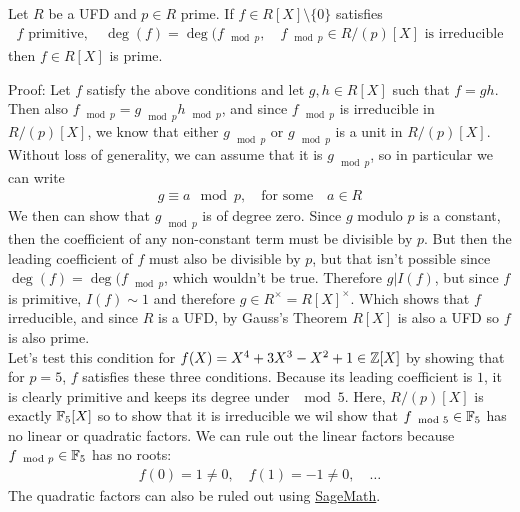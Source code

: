 \begin{proposition}[]
	Let $R$ be a UFD and $p \in R$ prime. If $f \in R[X] \setminus \{0\}$ satisfies
	\begin{align*}
		f \text{ primitive}, \quad \deg(f) = \deg(f_{\mod p}, \quad f_{\mod p} \in R/(p)[X] \text{ is irreducible}
	\end{align*}
	then $f \in R[X]$ is prime.
\end{proposition}
Proof: Let $f$ satisfy the above conditions and let $g, h \in R[X]$ such that $f = gh$. Then also $f_{\mod p} = g_{\mod p} h_{\mod p}$, and since $f_{\mod p}$ is irreducible in $R/(p)[X]$, we know that either $g_{\mod p}$ or $g_{\mod p}$ is a unit in $R/(p)[X]$. 
Without loss of generality, we can assume that it is $g_{\mod p}$, so in particular we can write 
\begin{align*}
	g \equiv a \mod p, \quad \text{for some} \quad a \in R
\end{align*}
We then can show that $g_{\mod p}$ is of degree zero. Since $g$ modulo $p$ is a constant, then the coefficient of any non-constant term must be divisible by $p$. But then the leading coefficient of $f$ must also be divisible by $p$, but that isn't possible since $\deg(f) = \deg(f_{\mod p}$, which wouldn't be true.
Therefore $g | I(f)$, but since $f$ is primitive, $I(f) \sim 1$ and therefore $g \in R^{\times} = R[X]^{\times}$. Which shows that $f$ irreducible, and since $R$ is a UFD, by Gauss's Theorem $R[X]$ is also a UFD so $f$ is also prime.\\


Let's test this condition for $f(X) = X^4 + 3X^3 - X^2 + 1 \in \mathbb{Z}[X]$ by showing that for $p = 5$, $f$ satisfies these three conditions.
Because its leading coefficient is $1$, it is clearly primitive and keeps its degree under $\mod 5$.
Here, $R/(p)[X]$ is exactly $\mathbb{F}_5[X]$ so to show that it is irreducible
we wil show that $f_{\mod 5} \in \mathbb{F}_5$ has no linear or quadratic factors.
We can rule out the linear factors because $f_{\mod p} \in \mathbb{F}_5$ has no roots:
\begin{align*}
	f(0) = 1 \neq 0, \quad f(1) = -1 \neq 0, \quad \ldots
\end{align*}
The quadratic factors can also be ruled out using \href{https://www.sagemath.org/}{SageMath}\footnotemark.

